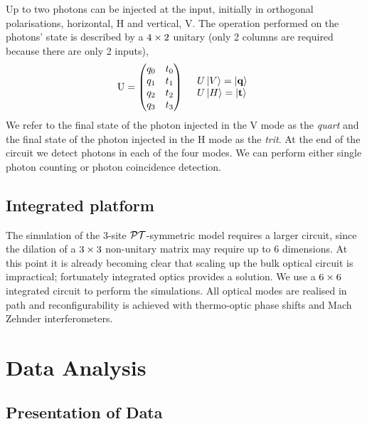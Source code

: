Up to two photons can be injected at the input, initially in orthogonal
polarisations, horizontal, H and vertical, V. The operation performed on the
photons' state is described by a \(4 \times 2\) unitary (only 2 columns are
required because there are only 2 inputs),
\begin{align}
  \mathrm{U} = \begin{pmatrix}
    q_{0} & t_{0} \\
    q_{1} & t_{1} \\
    q_{2} & t_{2} \\
    q_{3} & t_{3}
  \end{pmatrix} && \begin{array}{l}
    U \left|V\right\rangle = \left|\mathbf{q}\right\rangle \\
    U \left|H\right\rangle = \left|\mathbf{t}\right\rangle
  \end{array}
\end{align}
We refer to the final state of the photon injected in the V mode as
the \emph{quart} and the final state of the photon injected in the H
mode as the \emph{trit}. At the end of the circuit we detect photons in each of
the four modes. We can perform either single photon counting or photon
coincidence detection.

\subsection{Integrated platform}
The simulation of the 3-site \(\mathcal{PT}\)-symmetric model requires a larger circuit,
since the dilation of a \(3 \times 3\) non-unitary matrix may require up to 6
dimensions. At this point it is already becoming clear that scaling up the bulk
optical circuit is impractical; fortunately integrated optics provides a
solution. We use a \(6 \times 6\) integrated circuit to perform the simulations.
All optical modes are realised in path and reconfigurability is achieved with
thermo-optic phase shifts and Mach Zehnder interferometers.

\section{Data Analysis}
\subsection{Presentation of Data}

